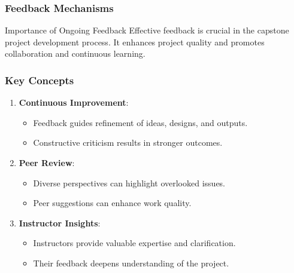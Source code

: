 \documentclass[aspectratio=169]{beamer}
\begin{document}
\begin{frame}[fragile]
    \frametitle{Feedback Mechanisms}
    \begin{block}{Importance of Ongoing Feedback}
        Effective feedback is crucial in the capstone project development process. It enhances project quality and promotes collaboration and continuous learning.
    \end{block}
\end{frame}

\begin{frame}[fragile]
    \frametitle{Key Concepts}
    \begin{enumerate}
        \item \textbf{Continuous Improvement}:
            \begin{itemize}
                \item Feedback guides refinement of ideas, designs, and outputs.
                \item Constructive criticism results in stronger outcomes.
            \end{itemize}
        \item \textbf{Peer Review}:
            \begin{itemize}
                \item Diverse perspectives can highlight overlooked issues.
                \item Peer suggestions can enhance work quality.
            \end{itemize}
        \item \textbf{Instructor Insights}:
            \begin{itemize}
                \item Instructors provide valuable expertise and clarification.
                \item Their feedback deepens understanding of the project.
            \end{itemize}
    \end{enumerate}
\end{frame}
\end{document}
